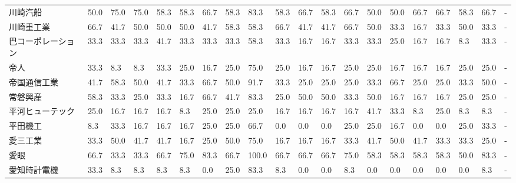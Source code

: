 \documentclass[a4paper，11pt]{jsarticle}
\begin{document}
\begin{longtable}[c]{lp{3mm}p{3mm}p{3mm}p{3mm}p{3mm}p{3mm}p{3mm}p{3mm}p{3mm}p{3mm}p{3mm}p{3mm}p{3mm}p{3mm}p{3mm}p{3mm}p{3mm}p{3mm}p{3mm}}
川崎汽船            &   50.0 &   75.0 &      75.0 &      58.3 &       58.3 &   66.7 &   58.3 &   83.3 &    58.3 &    66.7 &   58.3 &  66.7 &   50.0 &    50.0 &    66.7 &  66.7 &  58.3 &  66.7 &     - \\
川崎重工業           &   66.7 &   41.7 &      50.0 &      50.0 &       50.0 &   41.7 &   58.3 &   58.3 &    66.7 &    41.7 &   41.7 &  66.7 &   50.0 &    33.3 &    16.7 &  33.3 &  50.0 &  33.3 &     - \\
巴コーポレーション       &   33.3 &   33.3 &      33.3 &      41.7 &       33.3 &   33.3 &   33.3 &   58.3 &    33.3 &    16.7 &   16.7 &  33.3 &   33.3 &    25.0 &    16.7 &  16.7 &   8.3 &  33.3 &     - \\
帝人              &   33.3 &    8.3 &       8.3 &      33.3 &       25.0 &   16.7 &   25.0 &   75.0 &    25.0 &    16.7 &   16.7 &  25.0 &   25.0 &    16.7 &    16.7 &  16.7 &  25.0 &  25.0 &     - \\
帝国通信工業          &   41.7 &   58.3 &      50.0 &      41.7 &       33.3 &   66.7 &   50.0 &   91.7 &    33.3 &    25.0 &   25.0 &  25.0 &   33.3 &    66.7 &    25.0 &  25.0 &  33.3 &  50.0 &     - \\
常磐興産            &   58.3 &   33.3 &      25.0 &      33.3 &       16.7 &   66.7 &   41.7 &   83.3 &    25.0 &    50.0 &   50.0 &  33.3 &   50.0 &    16.7 &    16.7 &  16.7 &  25.0 &  25.0 &     - \\
平河ヒューテック        &   25.0 &   16.7 &      16.7 &      16.7 &        8.3 &   25.0 &   25.0 &   25.0 &    16.7 &    16.7 &   16.7 &  16.7 &   41.7 &    33.3 &     8.3 &  25.0 &   8.3 &   8.3 &     - \\
平田機工            &    8.3 &   33.3 &      16.7 &      16.7 &       16.7 &   25.0 &   25.0 &   66.7 &     0.0 &     0.0 &    0.0 &  25.0 &   25.0 &    16.7 &     0.0 &   0.0 &  25.0 &  33.3 &     - \\
愛三工業            &   33.3 &   50.0 &      41.7 &      41.7 &       16.7 &   25.0 &   50.0 &   75.0 &    16.7 &    16.7 &   16.7 &  33.3 &   41.7 &    50.0 &    41.7 &  33.3 &  33.3 &  25.0 &     - \\
愛眼              &   66.7 &   33.3 &      33.3 &      66.7 &       75.0 &   83.3 &   66.7 &  100.0 &    66.7 &    66.7 &   66.7 &  75.0 &   58.3 &    58.3 &    58.3 &  58.3 &  50.0 &  83.3 &     - \\
愛知時計電機          &   33.3 &    8.3 &       8.3 &       8.3 &        8.3 &    0.0 &   25.0 &   83.3 &     8.3 &     0.0 &    0.0 &   8.3 &    0.0 &     0.0 &     0.0 &   0.0 &   0.0 &   8.3 &     - \\

\end{longtable}
\end{document}
